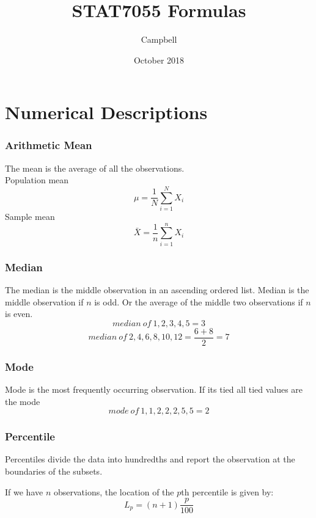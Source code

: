 \documentclass{article}
\title{STAT7055 Formulas}
\author{Campbell}
\date{October 2018}
\begin{document}
\maketitle
\pagebreak
\section{Numerical Descriptions}

\subsubsection{Arithmetic Mean}
The mean is the average of all the observations.
\\
Population mean
\begin{equation}
\mu = \frac{1}{N}\sum_{i = 1}^{N}X_i
\end{equation}
Sample mean
\begin{equation}
\bar{X} = \frac{1}{n}\sum_{i = 1}^{n}X_i
\end{equation}

\subsubsection{Median}
The median is the middle observation in an ascending ordered list.
Median is the middle observation if $n$ is odd.
Or the average of the middle two observations if $n$ is even.
\begin{equation}
median\:of\:{1, 2, 3, 4, 5} = 3
\end{equation}
\begin{equation}
median\:of\:{2, 4, 6, 8, 10, 12} = \frac{6+8}{2} = 7
\end{equation}

\subsubsection{Mode}
Mode is the most frequently occurring observation. If its tied all tied values are the mode
\begin{equation}
mode\:of\:{1, 1, 2, 2, 2, 5, 5} = 2
\end{equation}

\subsubsection{Percentile}
Percentiles divide the data into hundredths and report the observation at the boundaries of the subsets.

If we have $n$ observations, the location of the $p$th percentile is given by:
\begin{equation}
L_p = (n + 1)\frac{p}{100}
\end{equation}
\end{document}
